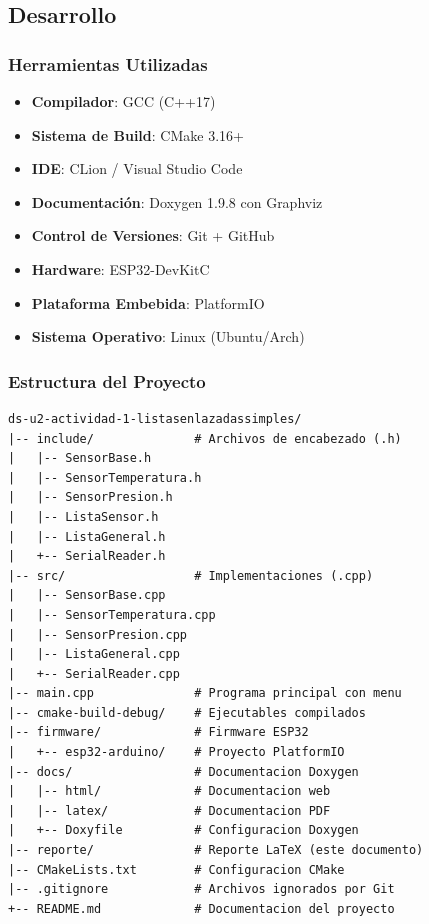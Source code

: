 \documentclass[conference]{IEEEtran}
\begin{document}
\subsection{Desarrollo}

\subsubsection{Herramientas Utilizadas}

\begin{itemize}
    \item \textbf{Compilador}: GCC (C++17)
    \item \textbf{Sistema de Build}: CMake 3.16+
    \item \textbf{IDE}: CLion / Visual Studio Code
    \item \textbf{Documentación}: Doxygen 1.9.8 con Graphviz
    \item \textbf{Control de Versiones}: Git + GitHub
    \item \textbf{Hardware}: ESP32-DevKitC
    \item \textbf{Plataforma Embebida}: PlatformIO
    \item \textbf{Sistema Operativo}: Linux (Ubuntu/Arch)
\end{itemize}

\subsubsection{Estructura del Proyecto}

\vspace{0.2cm}
\begin{verbatim}
ds-u2-actividad-1-listasenlazadassimples/
|-- include/              # Archivos de encabezado (.h)
|   |-- SensorBase.h
|   |-- SensorTemperatura.h
|   |-- SensorPresion.h
|   |-- ListaSensor.h
|   |-- ListaGeneral.h
|   +-- SerialReader.h
|-- src/                  # Implementaciones (.cpp)
|   |-- SensorBase.cpp
|   |-- SensorTemperatura.cpp
|   |-- SensorPresion.cpp
|   |-- ListaGeneral.cpp
|   +-- SerialReader.cpp
|-- main.cpp              # Programa principal con menu
|-- cmake-build-debug/    # Ejecutables compilados
|-- firmware/             # Firmware ESP32
|   +-- esp32-arduino/    # Proyecto PlatformIO
|-- docs/                 # Documentacion Doxygen
|   |-- html/             # Documentacion web
|   |-- latex/            # Documentacion PDF
|   +-- Doxyfile          # Configuracion Doxygen
|-- reporte/              # Reporte LaTeX (este documento)
|-- CMakeLists.txt        # Configuracion CMake
|-- .gitignore            # Archivos ignorados por Git
+-- README.md             # Documentacion del proyecto
\end{verbatim}
\vspace{0.2cm}
\end{document}
